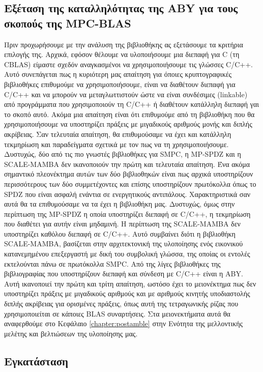 \subsection{Εξέταση της καταλληλότητας της ABY για τους σκοπούς της MPC-BLAS}

Πριν προχωρήσουμε με την ανάλυση της βιβλιοθήκης ας εξετάσουμε τα κριτήρια επιλογής της. Αρχικά, εφόσον θέλουμε να υλοποιήσουμε μια διεπαφή για C (τη CBLAS) είμαστε σχεδόν αναγκασμένοι να χρησιμοποιήσουμε τις γλώσσες C/C++. Αυτό συνεπάγεται πως η κυριότερη μας απαίτηση για όποιες κρυπτογραφικές βιβλιοθήκες επιθυμούμε να χρησιμοποιήσουμε, είναι να διαθέτουν διεπαφή για C/C++ και να μπορούν να μεταγλωττιστούν ώστε να είναι συνδέσιμες (linkable) από προγράμματα που χρησιμοποιούν τη C/C++ ή διαθέτουν κατάλληλη διεπαφή γαι το σκοπό αυτό. Ακόμα μια απαίτηση είναι ότι επιθυμούμε από τη βιβλιοθήκη που θα χρησιμοποιήσουμε να υποστηρίζει πράξεις με μιγαδικούς αριθμούς μονής και διπλής ακρίβειας. Σαν τελευταία απαίτηση, θα επιθυμούσαμε να έχει και κατάλληλη τεκμηρίωση και παραδείγματα σχετικά με τον πως να τη χρησιμοποιήσουμε. Δυστυχώς, δύο από τις πιο γνωστές βιβλιοθήκες για SMPC, η MP-SPDZ και η SCALE-MAMBA δεν ικανοποιούν την πρώτη και τελευταία απαίτηση. Ένα ακόμα σημαντικό πλεονέκτημα αυτών των δύο βιβλιοθηκών είναι πως αρχικά υποστηρίζουν περισσότερους των δύο συμμετέχοντες και επίσης υποστηρίζουν πρωτόκολλα όπως το SPDZ που είναι ασφαλή ενάντια σε ενεργητικούς αντιπάλους. Χαρακτηριστικά σαν αυτά θα τα επιθυμούσαμε να τα έχει η βιβλιοθήκη μας. Δυστυχώς, όμως στην περίπτωση της MP-SPDZ η οποία υποστηρίζει διεπαφή σε C/C++, η τεκμηρίωση που διαθέτει για αυτήν είναι μηδαμινή. Η περίπτωση της SCALE-MAMBA δεν υποστηρίζει καθόλου διεπαφή σε C/C++. Αυτό συμβαίνει διότι η βιβλιοθήκη SCALE-MAMBA, βασίζεται στην αρχιτεκτονική της υλοποίησης ενός εικονικού κατανεμημένου επεξεργαστή με δική του συμβολική γλώσσα, της οποίας οι εντολές εκτελούνται πάνω σε πρωτόκολλα SMPC. Από της λίγες βιβλιοθήκες της βιβλιογραφίας που υποστηρίζουν διεπαφή και σύνδεση με C/C++ είναι η ABY. Αυτή ικανοποιεί την πρώτη και τρίτη απαίτηση, ωστόσο έχει το μειονέκτημα πως δεν υποστηρίζει πράξεις με μιγαδικούς αριθμούς και με αριθμούς κινητής υποδιαστολής διπλής ακρίβειας για ορισμένες πράξεις, όπως αυτή της τετραγωνικής ρίζας που χρησιμοποιείται σε κάποιες BLAS συναρτήσεις. Στα μειονεκτήματα αυτά θα αναφερθούμε στο Κεφάλαιο \ref{chapter:postamble} στην Ενότητα της μελλοντικής μελέτης και βελτιώσεων της υλοποίησης μας.

\subsection{Εγκατάσταση}


